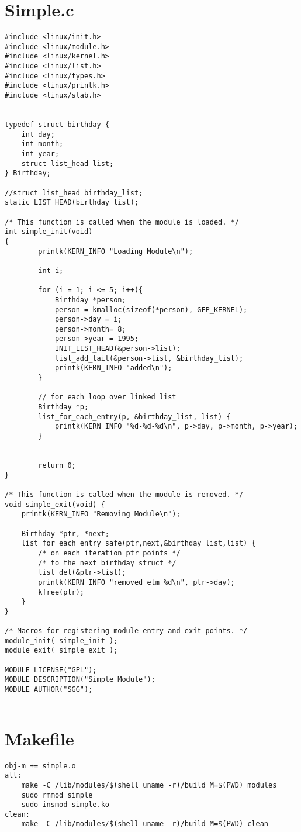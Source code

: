 \documentclass[danish]{report}
\begin{document}
\section{Simple.c}
\begin{lstlisting}
#include <linux/init.h>
#include <linux/module.h>
#include <linux/kernel.h>
#include <linux/list.h>
#include <linux/types.h>
#include <linux/printk.h>
#include <linux/slab.h>


typedef struct birthday {
    int day;
    int month;
    int year;
    struct list_head list;
} Birthday;

//struct list_head birthday_list;
static LIST_HEAD(birthday_list);

/* This function is called when the module is loaded. */
int simple_init(void)
{
        printk(KERN_INFO "Loading Module\n");
        
        int i;
        
        for (i = 1; i <= 5; i++){
            Birthday *person;
            person = kmalloc(sizeof(*person), GFP_KERNEL);
            person->day = i;
            person->month= 8;
            person->year = 1995;
            INIT_LIST_HEAD(&person->list);
            list_add_tail(&person->list, &birthday_list);
            printk(KERN_INFO "added\n");
        }
        
        // for each loop over linked list
        Birthday *p;
        list_for_each_entry(p, &birthday_list, list) {
            printk(KERN_INFO "%d-%d-%d\n", p->day, p->month, p->year);
        }
        
       
        return 0;
}

/* This function is called when the module is removed. */
void simple_exit(void) {
    printk(KERN_INFO "Removing Module\n");
    
    Birthday *ptr, *next;
    list_for_each_entry_safe(ptr,next,&birthday_list,list) {
        /* on each iteration ptr points */
        /* to the next birthday struct */
        list_del(&ptr->list);
        printk(KERN_INFO "removed elm %d\n", ptr->day);
        kfree(ptr);
    }
}

/* Macros for registering module entry and exit points. */
module_init( simple_init );
module_exit( simple_exit );

MODULE_LICENSE("GPL");
MODULE_DESCRIPTION("Simple Module");
MODULE_AUTHOR("SGG");


\end{lstlisting}

\section{Makefile}
\begin{lstlisting}
obj-m += simple.o
all:
    make -C /lib/modules/$(shell uname -r)/build M=$(PWD) modules
    sudo rmmod simple
    sudo insmod simple.ko
clean:
    make -C /lib/modules/$(shell uname -r)/build M=$(PWD) clean

\end{lstlisting}
\end{document}
